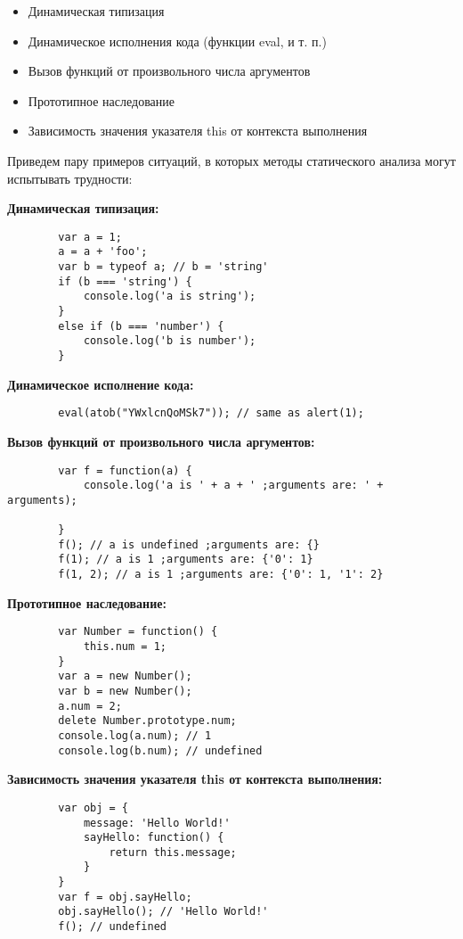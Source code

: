 	\begin{itemize}
		\item Динамическая типизация
		\item Динамическое исполнения кода (функции eval, и т. п.)
		\item Вызов функций от произвольного числа аргументов
		\item Прототипное наследование
		\item Зависимость значения указателя this от контекста выполнения
	\end{itemize}
	\bigskip

	Приведем пару примеров ситуаций, в которых методы статического анализа могут испытывать трудности:


	\bigskip
	\textbf{Динамическая типизация:}
	\begin{lstlisting}
		var a = 1;
		a = a + 'foo';
		var b = typeof a; // b = 'string'
		if (b === 'string') {
			console.log('a is string');
		}
		else if (b === 'number') {
			console.log('b is number');
		}
	\end{lstlisting}

	\bigskip
	\textbf{Динамическое исполнение кода:}
	\begin{lstlisting}
		eval(atob("YWxlcnQoMSk7")); // same as alert(1);
	\end{lstlisting}

	\bigskip
	\textbf{Вызов функций от произвольного числа аргументов:}
	\begin{lstlisting}
		var f = function(a) {
			console.log('a is ' + a + ' ;arguments are: ' + arguments);
			
		}
		f(); // a is undefined ;arguments are: {}
		f(1); // a is 1 ;arguments are: {'0': 1}
		f(1, 2); // a is 1 ;arguments are: {'0': 1, '1': 2}
	\end{lstlisting}		

	\bigskip
	\textbf{Прототипное наследование:}
	\begin{lstlisting}
		var Number = function() {
			this.num = 1;
		}
		var a = new Number();
		var b = new Number();
		a.num = 2;
		delete Number.prototype.num;
		console.log(a.num); // 1
		console.log(b.num); // undefined
	\end{lstlisting}	

	\bigskip
	\textbf{Зависимость значения указателя this от контекста выполнения:}
	\begin{lstlisting}
		var obj = {
			message: 'Hello World!'
			sayHello: function() {
				return this.message;
			}
		}
		var f = obj.sayHello;
		obj.sayHello(); // 'Hello World!'
		f(); // undefined
	\end{lstlisting}	


